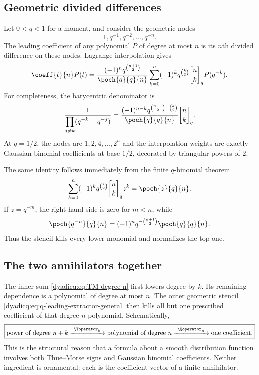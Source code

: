 \documentclass[11pt,oneside]{article}
\theoremstyle{definition}
\theoremstyle{remark}
\newcommand{\qbinom}[3]{\genfrac{[}{]}{0pt}{}{#1}{#2}_{#3}}
\begin{document}
\subsection{Geometric divided differences}

Let $0<q<1$ for a moment, and consider the geometric nodes
\[
  1,q^{-1},q^{-2},\ldots,q^{-n}.
\]
The leading coefficient of any polynomial $P$ of degree at most $n$ is its
$n$th divided difference on these nodes.  Lagrange interpolation gives
\begin{equation}\label{dyadicq:eq:q-leading-extractor-general}
 \coeff{t}{n}P(t)
 =\frac{(-1)^nq^{\binom{n+1}{2}}}{\poch{q}{q}{n}}
  \sum_{k=0}^{n}
  (-1)^kq^{\binom k2}\qbinom{n}{k}{q}P(q^{-k}).
\end{equation}
For completeness, the barycentric denominator is
\begin{equation}\label{dyadicq:eq:barycentric-denominator}
 \frac1{\displaystyle\prod_{j\ne k}(q^{-k}-q^{-j})}
 =\frac{(-1)^{n-k}q^{\binom{n+1}{2}+\binom k2}}
 {\poch{q}{q}{n}}\qbinom{n}{k}{q}.
\end{equation}
At $q=1/2$, the nodes are $1,2,4,\ldots,2^n$ and the interpolation weights are
exactly Gaussian binomial coefficients at base $1/2$, decorated by triangular
powers of $2$.

The same identity follows immediately from the finite $q$-binomial theorem
\begin{equation}\label{dyadicq:eq:finite-q-binomial}
 \sum_{k=0}^{n}(-1)^kq^{\binom k2}\qbinom{n}{k}{q}z^k
 =\poch{z}{q}{n}.
\end{equation}
If $z=q^{-m}$, the right-hand side is zero for $m<n$, while
\begin{equation}\label{dyadicq:eq:q-survivor}
  \poch{q^{-n}}{q}{n}
  =(-1)^nq^{-\binom{n+1}{2}}\poch{q}{q}{n}.
\end{equation}
Thus the stencil kills every lower monomial and normalizes the top one.

\subsection{The two annihilators together}

The inner sum \eqref{dyadicq:eq:TM-degree-n} first lowers degree by $k$.  Its remaining
dependence is a polynomial of degree at most $n$.  The outer geometric stencil
\eqref{dyadicq:eq:q-leading-extractor-general} then kills all but one prescribed
coefficient of that degree-$n$ polynomial.  Schematically,
\[
 \boxed{
 \text{power of degree }n+k
 \xrightarrow{\ \Toperator_k\ }
 \text{polynomial of degree }n
 \xrightarrow{\ \Qoperator_n\ }
 \text{one coefficient}.}
\]
This is the structural reason that a formula about a smooth distribution
function involves both Thue--Morse signs and Gaussian binomial coefficients.
Neither ingredient is ornamental: each is the coefficient vector of a finite
annihilator.
\end{document}
